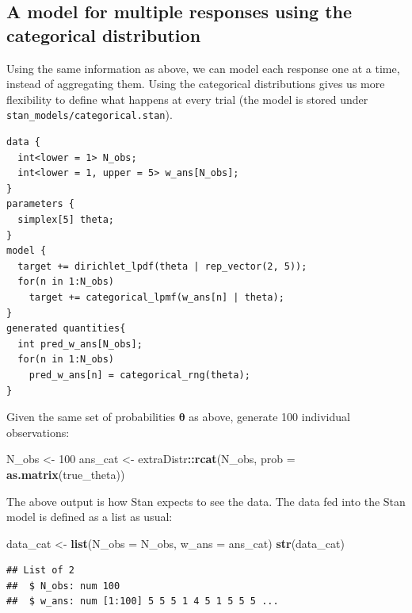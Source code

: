 \documentclass[12pt,]{krantz}
\newenvironment{Shaded}{\begin{snugshade}}{\end{snugshade}}
\newcommand{\DataTypeTok}[1]{\textcolor[rgb]{0.13,0.29,0.53}{#1}}
\newcommand{\DecValTok}[1]{\textcolor[rgb]{0.00,0.00,0.81}{#1}}
\newcommand{\KeywordTok}[1]{\textcolor[rgb]{0.13,0.29,0.53}{\textbf{#1}}}
\newcommand{\NormalTok}[1]{#1}
\newcommand{\OperatorTok}[1]{\textcolor[rgb]{0.81,0.36,0.00}{\textbf{#1}}}
\newcommand{\StringTok}[1]{\textcolor[rgb]{0.31,0.60,0.02}{#1}}
\theoremstyle{definition}
\theoremstyle{definition}
\theoremstyle{definition}
\theoremstyle{remark}
\begin{document}
\hypertarget{sec:cat}{%
\subsection{A model for multiple responses using the categorical distribution}\label{sec:cat}}

Using the same information as above, we can model each response one at a time, instead of aggregating them. Using the categorical distributions gives us more flexibility to define what happens at every trial (the model is stored under \texttt{stan\_models/categorical.stan}).

\begin{verbatim}
data {
  int<lower = 1> N_obs;
  int<lower = 1, upper = 5> w_ans[N_obs];
}
parameters {
  simplex[5] theta;
}
model {
  target += dirichlet_lpdf(theta | rep_vector(2, 5));
  for(n in 1:N_obs)
    target += categorical_lpmf(w_ans[n] | theta);
}
generated quantities{
  int pred_w_ans[N_obs];
  for(n in 1:N_obs)
    pred_w_ans[n] = categorical_rng(theta);
}
\end{verbatim}

Given the same set of probabilities \(\boldsymbol{\theta}\) as above, generate 100 individual observations:

\begin{Shaded}
\begin{Highlighting}[]
\NormalTok{N_obs <-}\StringTok{ }\DecValTok{100} 
\NormalTok{ans_cat <-}\StringTok{ }\NormalTok{extraDistr}\OperatorTok{::}\KeywordTok{rcat}\NormalTok{(N_obs, }\DataTypeTok{prob =} \KeywordTok{as.matrix}\NormalTok{(true_theta))}
\end{Highlighting}
\end{Shaded}

The above output is how Stan expects to see the data. The data fed into the Stan model is defined as a list as usual:

\begin{Shaded}
\begin{Highlighting}[]
\NormalTok{data_cat <-}\StringTok{  }\KeywordTok{list}\NormalTok{(}\DataTypeTok{N_obs =}\NormalTok{ N_obs,}
                  \DataTypeTok{w_ans =}\NormalTok{ ans_cat)}
\KeywordTok{str}\NormalTok{(data_cat)}
\end{Highlighting}
\end{Shaded}

\begin{verbatim}
## List of 2
##  $ N_obs: num 100
##  $ w_ans: num [1:100] 5 5 5 1 4 5 1 5 5 5 ...
\end{verbatim}
\end{document}
